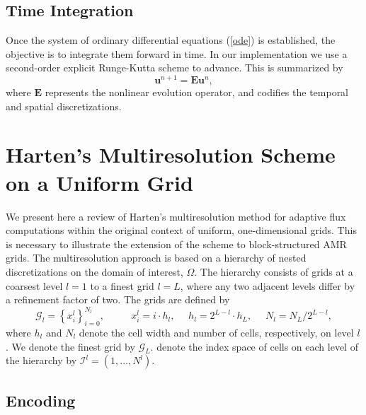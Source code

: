 \documentclass[12pt,letterpaper]{article}
\begin{document}
    \subsection{Time Integration}

        Once the system of ordinary differential equations (\ref{ode}) is
        established, the objective is to integrate them forward in time. In our
        implementation we use a second-order explicit Runge-Kutta scheme to
        advance. This is summarized by
        \begin{equation}
            \bm{u}^{n+1} = \bm{E} \bm{u}^{n},
        \end{equation}
        where $\bm{E}$ represents the nonlinear evolution operator, and codifies the
        temporal and spatial discretizations.

\section{Harten's Multiresolution Scheme on a Uniform Grid}

    We present here a review of Harten's multiresolution method for adaptive
    flux computations within the original context of uniform, one-dimensional
    grids. This is necessary to illustrate the extension of the scheme to
    block-structured AMR grids. The multiresolution approach is based on a
    hierarchy of nested discretizations on the domain of interest, $\Omega$.
    The hierarchy consists of grids at a coarsest level $l=1$ to a finest grid
    $l=L$, where any two adjacent levels differ by a refinement factor of two.
    The grids are defined by
    \begin{equation}
        \bm{\mathcal{G}}_{l} = \left\{ x_{i}^{l} \right\}_{i=0}^{N_{l}}, \text{ }
        \text{ } \text{ } \text{ } x_{i}^{l} = i \cdot h_{l}, \text{ }
        \text{ } h_{l} = 2^{L-l} \cdot h_{L}, \text{ } \text{ } N_{l} = N_{L}
        / 2^{L-l},
    \end{equation}
    where $h_{l}$ and $N_{l}$ denote the cell width and number of cells,
    respectively, on level $l$. We denote the finest grid by
    $\bm{\mathcal{G}}_{L}$. denote the index space of cells on each level
    of the hierarchy by $\bm{\mathcal{I}}^{l} = (1,\dots,N^{l})$.

    \subsection*{Encoding}
\end{document}
